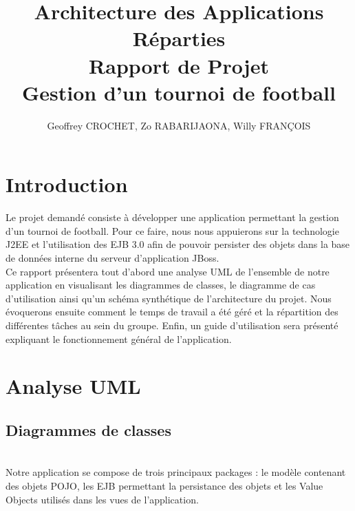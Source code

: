 \documentclass[10pt]{report}
\title{\textbf{Architecture des Applications Réparties\\ Rapport de Projet\\ Gestion d'un tournoi de football}}
\author{Geoffrey CROCHET, Zo RABARIJAONA, Willy FRANÇOIS}
\begin{document}
\maketitle


\newpage

\tableofcontents


\newpage
\chapter*{Introduction}


Le projet demandé consiste à développer une application permettant la gestion d'un tournoi de football. Pour ce faire, nous nous appuierons sur la technologie J2EE et l'utilisation des EJB 3.0 afin de pouvoir persister des objets dans la base de données interne du serveur d'application JBoss. \\

Ce rapport présentera tout d'abord une analyse UML de l'ensemble de notre application en visualisant les diagrammes de classes, le diagramme de cas d'utilisation ainsi qu'un schéma synthétique de l'architecture du projet. Nous évoquerons ensuite comment le temps de travail a été géré et la répartition des différentes tâches au sein du groupe. Enfin, un guide d'utilisation sera présenté expliquant le fonctionnement général de l'application.

\chapter{Analyse UML}
\section{Diagrammes de classes} 
~\\

Notre application se compose de trois principaux packages : le modèle contenant des objets POJO, les EJB permettant la persistance des objets et les Value Objects utilisés dans les vues de l'application. 

\newpage
\end{document}
